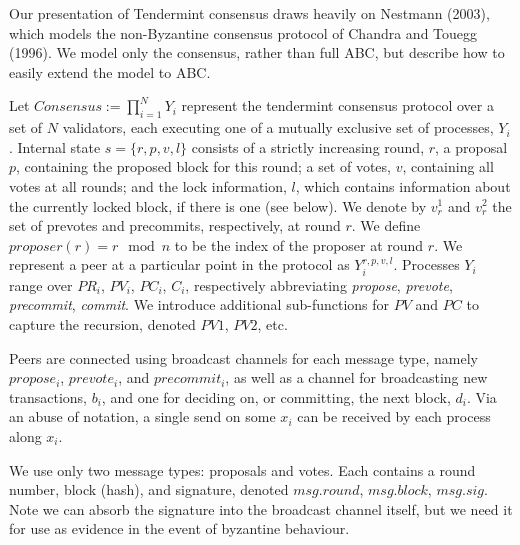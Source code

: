 \documentclass[12pt]{report}
\renewcommand{\|}{\;|\;}
\begin{document}
Our presentation of Tendermint consensus draws heavily on Nestmann (2003),
which models the non-Byzantine consensus protocol of Chandra and Touegg (1996).
We model only the consensus, rather than full ABC, but describe how to 
easily extend the model to ABC.

Let $Consensus := \prod_{i=1}^N Y_i $ represent the tendermint consensus protocol
over a set of $N$ validators, each executing one of a mutually exclusive set of processes, $Y_i$.
Internal state $s = \{r, p, v, l\}$ consists of a strictly increasing round, $r$,
a proposal $p$, containing the proposed block for this round;
a set of votes, $v$, containing all votes at all rounds;
and the lock information, $l$, which contains information about the currently locked block, if there is one (see below).
We denote by $v_r^1$ and $v_r^2$ the set of prevotes and precommits, respectively, at round $r$.
We define $proposer(r) = r \mod n$ to be the index of the proposer at round $r$.
We represent a peer at a particular point in the protocol as $Y_i^{r, p, v, l}$.
Processes $Y_i$ range over $PR_i$, $PV_i$, $PC_i$, $C_i$,
respectively abbreviating 
\emph{propose}, \emph{prevote}, \emph{precommit}, \emph{commit}.
We introduce additional sub-functions for $PV$ and $PC$ to capture the recursion,
denoted $PV1$, $PV2$, etc.

Peers are connected using broadcast channels for each message type,
namely $propose_i$, $prevote_i$, and $precommit_i$,
as well as a channel for broadcasting new transactions, $b_i$,
and one for deciding on, or committing, the next block, $d_i$.
Via an abuse of notation, a single send on some $x_i$ can be received by each process along
$x_i$.

We use only two message types: proposals and votes. 
Each contains a round number, block (hash), and signature, 
denoted $msg.round$, $msg.block$, $msg.sig$.
Note we can absorb the signature into the broadcast channel itself,
but we need it for use as evidence in the event of byzantine behaviour.
\end{document}
